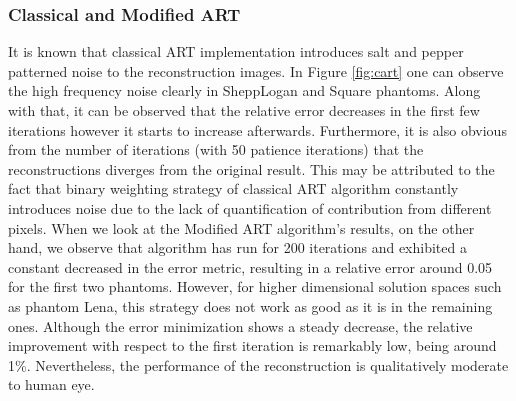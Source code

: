 \documentclass[journal]{IEEEtran}
\begin{document}
\subsubsection*{Classical and Modified ART}
It is known that classical ART implementation introduces salt and pepper patterned noise to the reconstruction images. In Figure \ref*{fig:cart} one can observe the high frequency noise clearly in SheppLogan and Square phantoms. Along with that, it can be observed that the relative error decreases in the first few iterations however it starts to increase afterwards. Furthermore, it is also obvious from the number of iterations (with 50 patience iterations) that the reconstructions diverges from the original result. This may be attributed to the fact that binary weighting strategy of classical ART algorithm constantly introduces noise due to the lack of quantification of contribution from different pixels. When we look at the Modified ART algorithm's results, on the other hand, we observe that algorithm has run for 200 iterations and exhibited a constant decreased in the error metric, resulting in a relative error around 0.05 for the first two phantoms. However, for higher dimensional solution spaces such as phantom Lena, this strategy does not work as good as it is in the remaining ones. Although the error minimization shows a steady decrease, the relative improvement with respect to the first iteration is remarkably low, being around 1\%. Nevertheless, the performance of the reconstruction is qualitatively moderate to human eye.  

\newpage
\printbibliography
\end{document}
